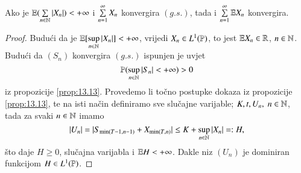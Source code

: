 \begin{prop}    \label{prop:13.14}
    Ako je $\mathbb{E} (\sum\limits_{n \in \mathbb{N}} |X_n|) < +\infty$ i $\sum\limits_{n = 1}^{\infty} X_n$ konvergira $(g.s.)$, tada i $\sum\limits_{n = 1}^{\infty} \mathbb{E} X_n$ konvergira.
\end{prop}

\begin{proof}
    Budu\' ci da je $\mathbb{E} [\sup\limits_{n \in \mathbb{N}} |X_n|] < +\infty$, vrijedi $X_n \in L^1 (\mathbb{P})$, to jest $\mathbb{E} X_n \in \mathbb{R}$, $n \in \mathbb{N}$.
    Budu\' ci da $(S_n)$ konvergira $(g.s.)$ ispunjen je uvjet
    \begin{equation*}
        \mathbb{P} (\sup\limits_{n \in \mathbb{N}} |S_n| < +\infty) > 0
    \end{equation*}
    iz propozicije \ref{prop:13.13}.
    Provedemo li to\v cno postupke dokaza iz propozicije \ref{prop:13.13}, te na isti na\v cin definiramo sve slu\v cajne varijable; $K, t, U_n, \; n \in \mathbb{N}$, tada za svaki $n \in \mathbb{N}$ imamo
    \begin{equation*}
        |U_n| = |S_{\min (T - 1, n - 1)} + X_{\min (T, n)}| \leq K + \sup\limits_{n \in \mathbb{N}} |X_n| =: H,
    \end{equation*}
    \v sto daje $H \geq 0$, slu\v cajna varijabla i $\mathbb{E} H < + \infty$.
    Dakle niz $(U_n)$ je dominiran funkcijom $H \in L^1 (\mathbb{P})$.


\end{proof}
